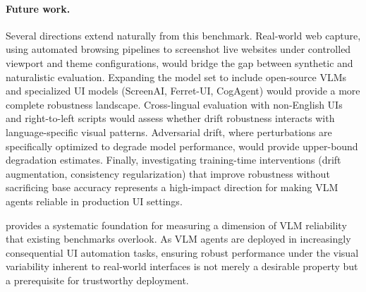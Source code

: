 \paragraph{Future work.}
Several directions extend naturally from this benchmark. Real-world web capture, using automated browsing pipelines to screenshot live websites under controlled viewport and theme configurations, would bridge the gap between synthetic and naturalistic evaluation. Expanding the model set to include open-source VLMs and specialized UI models (ScreenAI, Ferret-UI, CogAgent) would provide a more complete robustness landscape. Cross-lingual evaluation with non-English UIs and right-to-left scripts would assess whether drift robustness interacts with language-specific visual patterns. Adversarial drift, where perturbations are specifically optimized to degrade model performance, would provide upper-bound degradation estimates. Finally, investigating training-time interventions (drift augmentation, consistency regularization) that improve robustness without sacrificing base accuracy represents a high-impact direction for making VLM agents reliable in production UI settings.

\bench{} provides a systematic foundation for measuring a dimension of VLM reliability that existing benchmarks overlook. As VLM agents are deployed in increasingly consequential UI automation tasks, ensuring robust performance under the visual variability inherent to real-world interfaces is not merely a desirable property but a prerequisite for trustworthy deployment.
